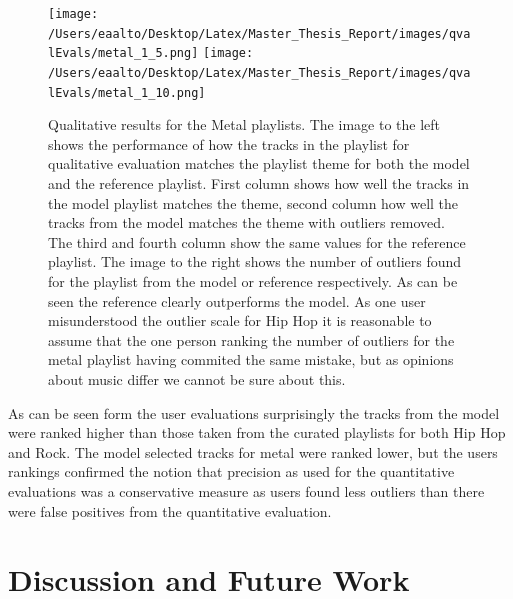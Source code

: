 \documentclass[a4paper,11pt]{kth-mag}
\begin{document}
\begin{figure}
\texttt{[image: /Users/eaalto/Desktop/Latex/Master\_Thesis\_Report/images/qvalEvals/metal\_1\_5.png]}
\texttt{[image: /Users/eaalto/Desktop/Latex/Master\_Thesis\_Report/images/qvalEvals/metal\_1\_10.png]}

\caption{Qualitative results for the Metal playlists. The image to the left shows the performance of how the tracks in the playlist for qualitative evaluation matches the playlist theme for both the model and the reference playlist. First column shows how well the tracks in the model playlist matches the theme, second column how well the tracks from the model matches the theme with outliers removed. The third and fourth column show the same values for the reference playlist. The image to the right shows the number of outliers found for the playlist from the model or reference respectively. As can be seen the reference clearly outperforms the model. As one user misunderstood the outlier scale for Hip Hop it is reasonable to assume that the one person ranking the number of outliers for the metal playlist having commited the same mistake, but as opinions about music differ we cannot be sure about this.}
\end{figure}

As can be seen form the user evaluations surprisingly the tracks from the model were ranked higher than those taken from the curated playlists for both Hip Hop and Rock. The model selected tracks for metal were ranked lower, but the users rankings confirmed the notion that precision as used for the quantitative evaluations was a conservative measure as users found less outliers than there were false positives from the quantitative evaluation.

\chapter{Discussion and Future Work}
\end{document}

